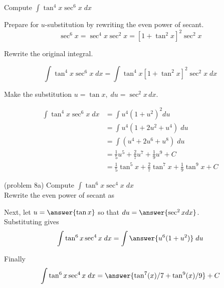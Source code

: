 \documentclass[handout]{ximera}
\begin{document}
\begin{example}[example 8]
Compute $\displaystyle{\int \tan^4 x \sec^6 x\;dx}$

Prepare for $u$-substitution by rewriting the even power of secant.
\[
\sec^6 x = \sec^4 x \sec^2 x = \left[1+\tan^2 x\right]^2 \sec^2 x
\]

Rewrite the original integral.

\[
\int \tan^4 x \sec^6 x\;dx = \int \tan^4 x \left[1+\tan^2 x\right]^2 \sec^2 x \; dx
\]

Make the substitution $u = \tan x, \; du = \sec^2 x \, dx$.


\begin{align*}
\int \tan^4 x \sec^6 x\;dx &= \int u^4 (1+u^2)^2 du\\
&= \int u^4(1+2u^2 + u^4) \; du \\
&= \int (u^4 + 2u^6 + u^8) \; du \\
&=  \tfrac15 u^5 + \tfrac27 u^7 + \tfrac19 u^9 + C  \\
&= \tfrac15\tan^5 x  + \tfrac27 \tan^7 x + \tfrac19 \tan^9 x + C
\end{align*}
\end{example} 



\begin{problem}(problem 8a)
Compute $\displaystyle{\int \tan^6 x\sec^4 x \; dx}$\\

Rewrite the even power of secant as

\begin{multipleChoice}
\end{multipleChoice}

Next, let $u = \answer{\tan x}$ so that $du = \answer{\sec^2 x dx}$.\\

Substituting gives 
\[
\int \tan^6 x\sec^4 x \; dx= \int \answer{u^6(1+u^2)} \; du
\]

Finally 
\[
\int \tan^6 x\sec^4 x \; dx= \answer{\tan^7(x)/7 +  \tan^9(x)/9} + C
\]

\end{problem}
\end{document}
